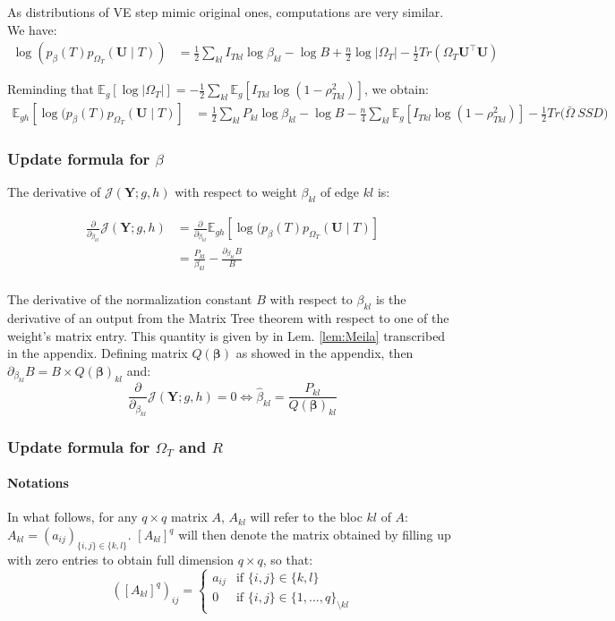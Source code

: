 \documentclass[11pt,a4paper]{article}
\newcommand{\betabf}{\boldsymbol{\beta}}
\newcommand{\Ybf}{\boldsymbol{Y}}
\newcommand{\Ubf}{\boldsymbol{U}}
\newcommand{\Esp}{\mathds{E}}
\begin{document}
As distributions of VE step mimic original ones, computations are very similar. We have:
\begin{align*}
\log (p_\beta(T)p_{\Omega_T}(\Ubf\mid T))  &= \frac{1}{2}\sum_{kl} I_{Tkl} \log \beta_{kl} - \log B + \frac{n}{2}\log |\Omega_T| - \frac{1}{2}Tr(\Omega_T \Ubf^\intercal \Ubf) 
\end{align*}

Reminding that $ \Esp_g[\log|\Omega_T|]=-\frac{1}{2}\sum_{kl} \Esp_g[ I_{Tkl}\log(1-\rho_{Tkl}^2)]$,  we obtain:
\begin{align*}
\Esp_{gh} [\log (p_\beta(T)p_{\Omega_T}(\Ubf\mid T) ] &=\frac{1}{2}\sum_{kl} P_{kl} \log  \beta_{kl} - \log B - \frac{n}{4} \sum_{kl} \Esp_g[ I_{Tkl}\log(1-\rho_{Tkl}^2)]  - \frac{1}{2}Tr\big(\bar{\Omega}\: SSD\big) 
\end{align*}
 
 \subsubsection{Update formula for $\beta$}
 The derivative of $ \mathcal{J}(\Ybf ; g,h)$ with respect to weight $\beta_{kl}$ of edge $kl$ is:
 
 \begin{align*}
\frac{\partial}{\partial_{\beta_{kl}}} \mathcal{J}(\Ybf ; g,h) &=  \frac{\partial}{\partial_{\beta_{kl}}} \Esp_{gh} [\log (p_\beta(T)p_{\Omega_T}(\Ubf\mid T) ] \\
&= \frac{P_{kl}}{\beta_{kl}} - \frac{\partial_{\beta_{kl}} B }{B} \\
\end{align*}

The derivative of the normalization constant $B$ with respect to $\beta_{kl}$ is the derivative of an output from the Matrix Tree theorem with respect to one of the weight's matrix entry. This quantity is given by \citet{Meila} in Lem. \ref{lem:Meila} transcribed in the appendix. Defining matrix $Q(\betabf)$ as showed in the appendix, then $\partial_{\beta_{kl}} B = B\times Q(\betabf)_{kl}$ and:
$$\frac{\partial}{\partial_{\beta_{kl}}} \mathcal{J}(\Ybf ; g,h) 
=0 \iff  \boxed{\widehat{\beta}_{kl} = \frac{P_{kl}}{ Q(\betabf)_{kl}} }$$

 \subsubsection{Update formula for $\Omega_T$ and $R$}
 \paragraph{Notations\\}
In what follows, for any $q\times q$  matrix $A$, $A_{kl}$ will refer to the bloc $kl$ of $A$: $A_{kl}=(a_{ij})_{\{i,j\}\in\{k,l\}}$.   $[A_{kl}]^q$ will then denote the matrix obtained by filling up with zero entries to obtain full dimension $q\times q$, so that:
$$([A_{kl}]^q )_{ij}=\left\{ \begin{array}{rl}
a_{ij} & \text{if } \{i,j\}\in\{k,l\}\\
0 &  \text{if } \{i,j\}\in\{1,..., q\}_{\setminus kl}
\end{array}\right.$$
\end{document}
